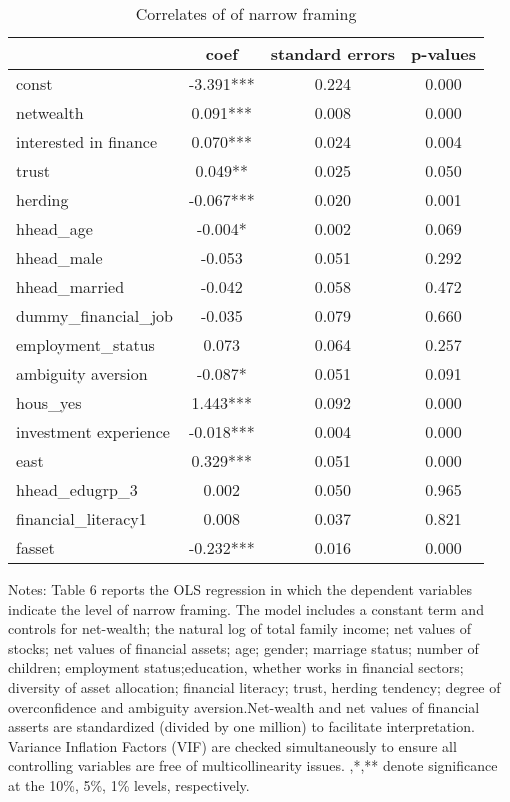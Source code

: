 \documentclass[ukenglish,nottitlepage,thmsb,11pt,letterpaper]{article}
\begin{document}
\begin{table}[H]
	\centering
	\caption{Correlates of of narrow framing}
	\begin{tabular*}{\textwidth}{l @{\extracolsep{\fill}} ccc}
		\toprule
		& \multicolumn{1}{c}{coef} & \multicolumn{1}{c}{standard errors} & \multicolumn{1}{c}{p-values} \\
		\midrule
		const                   &-3.391***	&0.224	&0.000 \\
		netwealth               &0.091***	&0.008	&0.000 \\
		interested in finance   &0.070***	&0.024	&0.004 \\
		trust                   &0.049**	&0.025	&0.050 \\
		herding                 &-0.067***	&0.020	&0.001 \\
		hhead\_age              &-0.004*	&0.002	&0.069 \\
		hhead\_male             &-0.053 	&0.051	&0.292 \\
		hhead\_married          &-0.042 	&0.058	&0.472 \\
		dummy\_financial\_job   &-0.035 	&0.079	&0.660 \\
		employment\_status      &0.073  	&0.064	&0.257 \\
		ambiguity aversion      &-0.087*    &0.051	&0.091 \\
		hous\_yes               &1.443***	&0.092	&0.000 \\
		investment experience   &-0.018***	&0.004	&0.000 \\
		east                    &0.329***	&0.051	&0.000 \\
		hhead\_edugrp\_3        &0.002  	&0.050	&0.965 \\
		financial\_literacy1    &0.008  	&0.037	&0.821 \\
		fasset                  &-0.232***	&0.016	&0.000 \\
		
		\bottomrule
	\end{tabular*}%
	\begin{tablenotes}
		\small
		\item Notes: Table 6 reports the OLS regression in which the dependent variables indicate the level of narrow framing. The model includes a constant term and controls for net-wealth; the natural log of total family income; net values of stocks; net values of financial assets; age; gender; marriage status; number of children; employment status;education, whether works in financial sectors; diversity of asset allocation; financial literacy; trust, herding tendency; degree of overconfidence and ambiguity aversion.Net-wealth and net values of financial asserts are standardized (divided by one million) to facilitate interpretation. Variance Inflation Factors (VIF) are checked simultaneously to ensure all controlling variables are free of multicollinearity issues. {\tiny*},{\tiny**},{\tiny***} denote significance at the 10\%, 5\%, 1\% levels, respectively.
	\end{tablenotes}
	\label{tab:addlabel}%
\end{table}%
\end{document}
